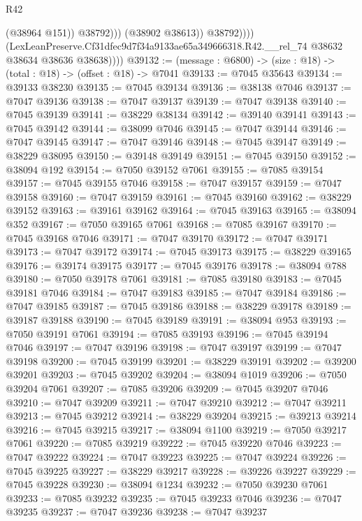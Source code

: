 \begin{lexlean}{R42}
\begin{coremodule}
{                            (@38964 @151))
                          @38792)))
                    (@38902 @38613))
                  @38792))))
          (LexLeanPreserve.Cf31dfec9d7f34a9133ae65a349666318.R42.__rel_74
            @38632
            @38634
            @38636
            @38638))))
@39132 := (message : @6800) -> (size : @18) -> (total : @18) -> (offset : @18) -> @7041
@39133 := @7045 @35643
@39134 := @39133 @38230
@39135 := @7045 @39134
@39136 := @38138 @7046
@39137 := @7047 @39136
@39138 := @7047 @39137
@39139 := @7047 @39138
@39140 := @7045 @39139
@39141 := @38229 @38134
@39142 := @39140 @39141
@39143 := @7045 @39142
@39144 := @38099 @7046
@39145 := @7047 @39144
@39146 := @7047 @39145
@39147 := @7047 @39146
@39148 := @7045 @39147
@39149 := @38229 @38095
@39150 := @39148 @39149
@39151 := @7045 @39150
@39152 := @38094 @192
@39154 := @7050 @39152 @7061
@39155 := @7085 @39154
@39157 := @7045 @39155 @7046
@39158 := @7047 @39157
@39159 := @7047 @39158
@39160 := @7047 @39159
@39161 := @7045 @39160
@39162 := @38229 @39152
@39163 := @39161 @39162
@39164 := @7045 @39163
@39165 := @38094 @352
@39167 := @7050 @39165 @7061
@39168 := @7085 @39167
@39170 := @7045 @39168 @7046
@39171 := @7047 @39170
@39172 := @7047 @39171
@39173 := @7047 @39172
@39174 := @7045 @39173
@39175 := @38229 @39165
@39176 := @39174 @39175
@39177 := @7045 @39176
@39178 := @38094 @788
@39180 := @7050 @39178 @7061
@39181 := @7085 @39180
@39183 := @7045 @39181 @7046
@39184 := @7047 @39183
@39185 := @7047 @39184
@39186 := @7047 @39185
@39187 := @7045 @39186
@39188 := @38229 @39178
@39189 := @39187 @39188
@39190 := @7045 @39189
@39191 := @38094 @953
@39193 := @7050 @39191 @7061
@39194 := @7085 @39193
@39196 := @7045 @39194 @7046
@39197 := @7047 @39196
@39198 := @7047 @39197
@39199 := @7047 @39198
@39200 := @7045 @39199
@39201 := @38229 @39191
@39202 := @39200 @39201
@39203 := @7045 @39202
@39204 := @38094 @1019
@39206 := @7050 @39204 @7061
@39207 := @7085 @39206
@39209 := @7045 @39207 @7046
@39210 := @7047 @39209
@39211 := @7047 @39210
@39212 := @7047 @39211
@39213 := @7045 @39212
@39214 := @38229 @39204
@39215 := @39213 @39214
@39216 := @7045 @39215
@39217 := @38094 @1100
@39219 := @7050 @39217 @7061
@39220 := @7085 @39219
@39222 := @7045 @39220 @7046
@39223 := @7047 @39222
@39224 := @7047 @39223
@39225 := @7047 @39224
@39226 := @7045 @39225
@39227 := @38229 @39217
@39228 := @39226 @39227
@39229 := @7045 @39228
@39230 := @38094 @1234
@39232 := @7050 @39230 @7061
@39233 := @7085 @39232
@39235 := @7045 @39233 @7046
@39236 := @7047 @39235
@39237 := @7047 @39236
@39238 := @7047 @39237
}
\end{coremodule}
\end{lexlean}
